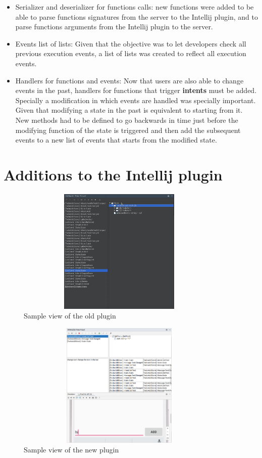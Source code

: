 \begin{itemize}
	\item Serializer and deserializer for functions calls: new functions were added to be able to parse functions signatures from the server to the Intellij plugin, and to parse functions arguments from the Intellij plugin to the server.
	\item Events list of lists: Given that the objective was to let developers check all previous execution events, a list of lists was created to reflect all execution events.
	\item Handlers for functions and events: Now that users are also able to change events in the past, handlers for functions that trigger \textbf{intents} must be added. Specially a modification in which events are handled was specially important. Given that modifying a state in the past is equivalent to starting from it. New methods had to be defined to go backwards in time just before the modifying function of the state is triggered and then add the subsequent events to a new list of events that starts from the modified state.
\end{itemize}

\section{Additions to the Intellij plugin}

\begin{figure}[h]
\centering
\includegraphics[height=6cm,width=10cm]{figures/oldPlugin}
\caption{Sample view of the old plugin}
\label{fig: Sample view of the old plugin}
\end{figure}

\begin{figure}[h]
\centering
\includegraphics[height=6cm,width=10cm]{figures/plugin}
\caption{Sample view of the new plugin}
\label{fig: Sample view of the new plugin}
\end{figure}

